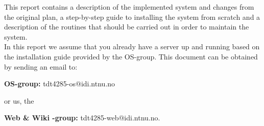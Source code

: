 This report contains a description of the implemented system and changes from the original plan, a step-by-step guide to installing the system from scratch and a description of the routines that should be carried out in order to maintain the system. \\

In this report we assume that you already have a server up and running based on the installation guide provided by the OS-group. This document can be obtained by sending an email to: \\
\begin{description}
\item{\textbf{OS-group:}} tdt4285-os@idi.ntnu.no
\item{or us, the}
\item{\textbf{Web \& Wiki -group:}} tdt4285-web@idi.ntnu.no.
\end{description}